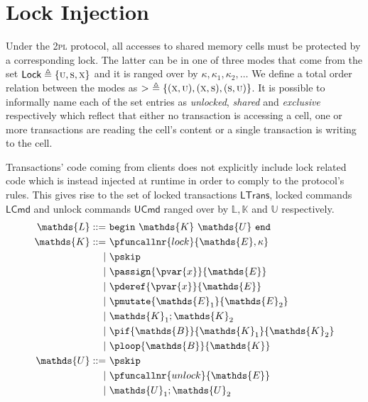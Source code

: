 \section{Lock Injection}

Under the \textsc{2pl} protocol, all accesses to shared memory cells must be protected by a corresponding lock. The latter can be in one of three modes that come from the set $\mathsf{Lock} \triangleq \{ \textsc{u}, \textsc{s}, \textsc{x} \}$ and it is ranged over by $\kappa, \kappa_1, \kappa_2, \ldots$ We define a total order relation between the modes as $>\ \triangleq \{ (\textsc{x}, \textsc{u}), (\textsc{x}, \textsc{s}), (\textsc{s}, \textsc{u}) \}$. It is possible to informally name each of the set entries as \textit{unlocked}, \textit{shared} and \textit{exclusive} respectively which reflect that either no transaction is accessing a cell, one or more transactions are reading the cell's content or a single transaction is writing to the cell.

Transactions' code coming from clients does not explicitly include lock related code which is instead injected at runtime in order to comply to the protocol's rules. This gives rise to the set of locked transactions $\textsf{LTrans}$, locked commands $\textsf{LCmd}$ and unlock commands $\textsf{UCmd}$ ranged over by $\mathds{L}, \mathds{K}$ and $\mathds{U}$ respectively.
\begin{align*}
\mathds{L} ::=&
\ \mathtt{begin}\ \mathds{K}\ \mathds{U}\ \mathtt{end} \\
\mathds{K} ::=&
\ \pfuncallnr{lock}{\mathds{E}, \kappa} \\
|&\ \pskip \\
|&\ \passign{\pvar{x}}{\mathds{E}} \\
|&\ \pderef{\pvar{x}}{\mathds{E}} \\
|&\ \pmutate{\mathds{E}_1}{\mathds{E}_2} \\
|&\ \mathds{K}_1; \mathds{K}_2 \\
|&\ \pif{\mathds{B}}{\mathds{K}_1}{\mathds{K}_2} \\
|&\ \ploop{\mathds{B}}{\mathds{K}} \\
\mathds{U} ::=&
\ \pskip \\
|&\ \pfuncallnr{unlock}{\mathds{E}} \\
|&\ \mathds{U}_1; \mathds{U}_2
\end{align*}

